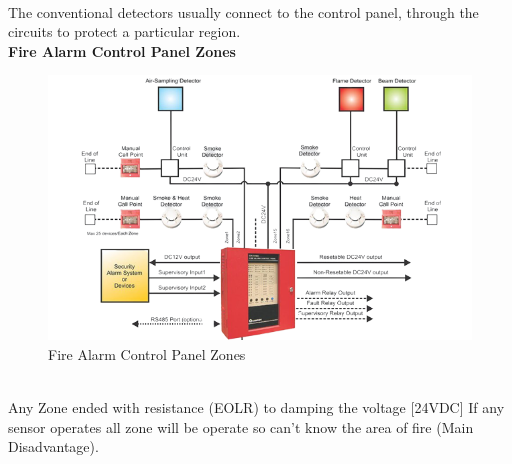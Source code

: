 \documentclass[12pt,fleqn]{book} %
\begin{document}
\begin{enumerate}
    \\ The conventional detectors usually connect to the control panel, through the circuits to protect a particular region.
    \\ \textbf{Fire Alarm Control Panel Zones}
    \begin{figure}[!h]
    \centering
    \includegraphics[width=0.9\linewidth]{hamdy 45.png}
    \caption{Fire Alarm Control Panel Zones}
    \label{fig:hamdy 45}
    \end{figure}
    \\ Any Zone ended with resistance (EOLR) to damping the voltage [24VDC]
If any sensor operates all zone will be operate so can't know the area of fire (Main Disadvantage).


\end{enumerate}
\end{document}
